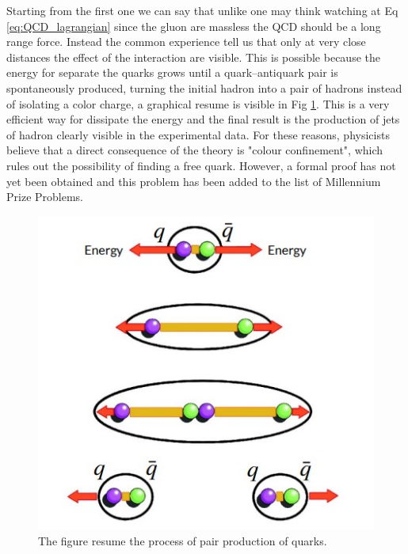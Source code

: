 \documentclass[12pt,a4paper]{book}
\begin{document}
	Starting from the first one we can say that unlike one may think watching at Eq \ref{eq:QCD_lagrangian} since the gluon are massless the QCD should be a long range force. Instead the common experience tell us that only at very close distances the effect of the interaction are visible. This is possible because the energy for separate the quarks grows until a quark–antiquark pair is spontaneously produced, turning the initial hadron into a pair of hadrons instead of isolating a color charge, a graphical resume is visible in Fig \ref{fig:quark_confinement}. This is a very efficient way for dissipate the energy and the final result is the production of jets of hadron clearly visible in the experimental data.  For these reasons, physicists believe that a direct consequence of the theory is "colour confinement", which rules out the possibility of finding a free quark. However, a formal proof has not yet been obtained and this problem has been added to the list of Millennium Prize Problems.
	\begin{figure}		
		\centering
		\includegraphics[width=0.5\linewidth]{pictures/quark_confinement.jpeg}
		\caption{The figure resume the process of pair production of quarks. \cite{modern_physics}}
		\label{fig:quark_confinement} 
	\end{figure}
	
\end{document}
